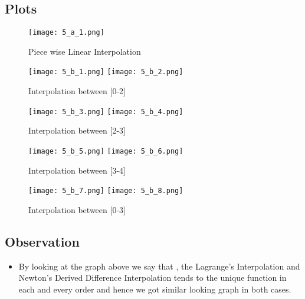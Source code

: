 \documentclass{article}
\begin{document}
\subsection{Plots}
\begin{figure}[!h]
    \centering
    \texttt{[image: 5\_a\_1.png]}
    \caption{Piece wise Linear Interpolation}
\end{figure}
\newpage
\begin{figure}[!h]
    \centering
    \texttt{[image: 5\_b\_1.png]}
    \texttt{[image: 5\_b\_2.png]}
    \caption{Interpolation between [0-2]}
\end{figure}
\begin{figure}[!h]
    \centering
    \texttt{[image: 5\_b\_3.png]}
    \texttt{[image: 5\_b\_4.png]}
    \caption{Interpolation between [2-3]}
\end{figure}
\begin{figure}[]
    \centering
    \texttt{[image: 5\_b\_5.png]}
    \texttt{[image: 5\_b\_6.png]}
    \caption{Interpolation between [3-4]}
\end{figure}
\begin{figure}[!h]
    \centering
    \texttt{[image: 5\_b\_7.png]}
    \texttt{[image: 5\_b\_8.png]}
    \caption{Interpolation between [0-3]}
\end{figure}
\subsection{Observation}
\begin{itemize}
   \item By looking at the graph above we say that , the Lagrange's Interpolation and Newton's Derived Difference Interpolation tends to the unique function in each and every order and hence we got similar looking graph in both cases.
\end{itemize}
\end{document}
